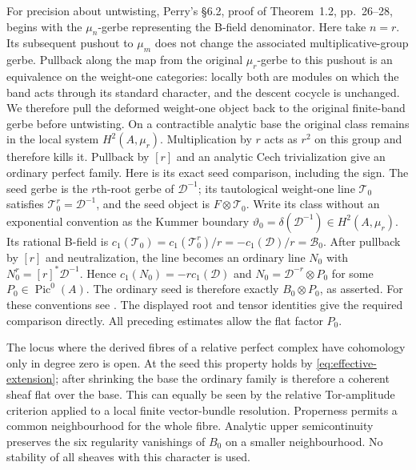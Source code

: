 \documentclass[11pt]{article}
\theoremstyle{definition}
\theoremstyle{remark}
\begin{document}
For precision about untwisting, Perry's \S6.2, proof of Theorem~1.2, pp.~26--28, begins with the $\mu_n$-gerbe representing
the B-field denominator. Here take $n=r$. Its subsequent pushout
to $\mu_m$ does not change the associated multiplicative-group gerbe. Pullback along the map from the original $\mu_r$-gerbe to this pushout is an equivalence on the weight-one categories: locally both are modules on which the band acts through its standard character, and the descent cocycle is unchanged. We therefore pull the deformed weight-one object back to the original finite-band gerbe before untwisting. On a
contractible analytic base the original class remains in the
local system $H^2(A,\mu_r)$. Multiplication by $r$ acts as
$r^2$ on this group and therefore kills it. Pullback by $[r]$
and an analytic Cech trivialization give an ordinary perfect
family. Here is its exact seed comparison, including the sign.
The seed gerbe is the $r$th-root gerbe of $\mathcal D^{-1}$;
its tautological weight-one line $\mathcal T_0$ satisfies
$\mathcal T_0^r=\mathcal D^{-1}$, and the seed object is
$F\otimes\mathcal T_0$. Write its class without an exponential
convention as the Kummer boundary
$\vartheta_0=\delta(\mathcal D^{-1})\in H^2(A,\mu_r)$.
Its rational B-field is
$c_1(\mathcal T_0)=c_1(\mathcal T_0^r)/r
=-c_1(\mathcal D)/r=\mathcal B_0$.
After pullback by $[r]$ and neutralization, the line becomes
an ordinary line $N_0$ with
$N_0^r=[r]^*\mathcal D^{-1}$. Hence
$c_1(N_0)=-r c_1(\mathcal D)$ and
$N_0=\mathcal D^{-r}\otimes P_0$ for some
$P_0\in\operatorname{Pic}^0(A)$. The ordinary seed is therefore
exactly $B_0\otimes P_0$, as asserted.
For these conventions see \cite[Definition~4.5, Lemma~4.6, Remark~4.13, Definition~4.16 and Theorem~4.17, author pp.~15--18]{Hotchkiss}. The displayed root and tensor identities give the required
comparison directly. All preceding estimates allow the flat
factor $P_0$.

The locus where the derived fibres of a relative perfect
complex have cohomology only in degree zero is open. At the
seed this property holds by \eqref{eq:effective-extension}; after shrinking the base
the ordinary family is therefore a coherent sheaf flat over
the base. This can equally be seen by the relative Tor-amplitude
criterion applied to a local finite vector-bundle resolution.
Properness permits a common neighbourhood for the whole fibre.
Analytic upper semicontinuity preserves the six regularity
vanishings of $B_0$ on a smaller neighbourhood. No stability
of all sheaves with this character is used.
\end{document}
